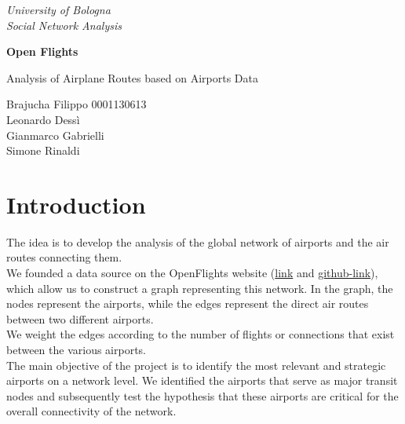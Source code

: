\documentclass[12pt]{article}
\begin{document}
\begin{titlepage}

\begin{center}
    { \textit{University of Bologna} }\\
    \vspace{5mm}
    { \textit{Social Network Analysis} }\\
\end{center}

\vspace{20mm}

\begin{center}
    {\LARGE{\bf Open Flights}}\\
\end{center}

\vspace{20mm}

\begin{center}
    {\LARGE{Analysis of Airplane Routes based on Airports Data}}\\
\end{center}

\vspace{30mm}

\begin{center}
    {\large{Brajucha Filippo 0001130613\\}}
    \vspace{5mm}
    {\large{Leonardo Dessì \\}}
    \vspace{5mm}
    {\large{Gianmarco Gabrielli  \\}}
    \vspace{5mm}
    {\large{Simone Rinaldi \\}}
\end{center}

\vspace{40mm}

\end{titlepage}

\section{Introduction}
The idea is to develop the analysis of the global network of airports and the air routes connecting them. \\
We founded a data source on the OpenFlights website (\hyperlink{https://openflights.org/}{link} and \hyperlink{https://github.com/jpatokal/openflights}{github-link}), which allow us to construct a graph representing this network. In the graph, the nodes represent the airports, while the edges represent the direct air routes between two different airports.\\ 
We weight the edges according to the number of flights or connections that exist between the various airports.\\
The main objective of the project is to identify the most relevant and strategic airports on a network level. We identified the airports that serve as major transit nodes and subsequently test the hypothesis that these airports are critical for the overall connectivity of the network.
\end{document}
